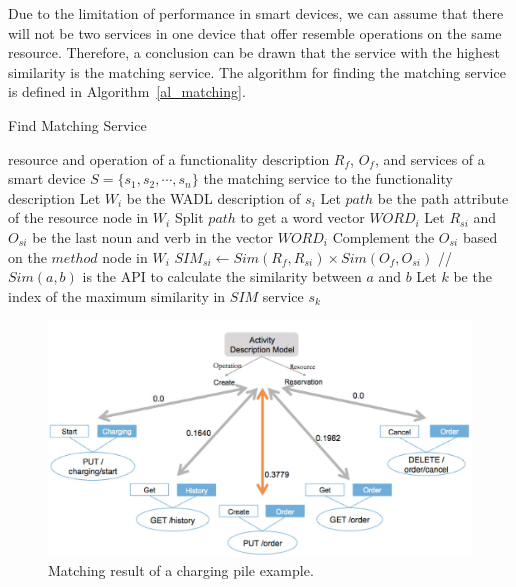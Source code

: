 Due to the limitation of performance in smart devices, we can assume that there will not be two services in one device that offer resemble operations on the same resource. Therefore, a conclusion can be drawn that the service with the highest similarity is the matching service. The algorithm for finding the matching service is defined in Algorithm~\ref{al_matching}. 
 \begin{algorithm}
        \caption{Find Matching Service}
        \begin{algorithmic}[1] 
            \Require resource and operation of a functionality description $R_f$, $O_f$, and services of a smart device $S = \{ s_1, s_2,\cdots,s_n\}$
            \Ensure the matching service to the functionality description
                   	   \State Let $W_i$ be the WADL description of $s_i$
  					   \State Let $path$ be the path attribute of the resource node in $W_i$
  					   \State Split $path$ to get a word vector $WORD_i$
  					   \State Let $R_{si}$ and $O_{si}$ be the last noun and verb in the vector $WORD_i$
  					   		\State Complement the $O_{si}$ based on the $method$ node in $W_i$
  					   \EndIf
  					   \State $SIM_{si} \leftarrow Sim(R_f,R_{si}) \times Sim(O_f,O_{si})$ //$Sim(a,b)$ is the API to calculate the similarity between $a$ and $b$
				   \EndFor
				   \State Let $k$ be the index of the maximum similarity in $SIM$
				   \State\Return service $s_k$ 
        \end{algorithmic}
        \label{al_matching}
 \end{algorithm}
 
\begin{figure}[!t]
\centering
\includegraphics[width=1.0\linewidth]{./graph/matching}
\caption{Matching result of a charging pile example.}
\label{fig_matching}
\end{figure}


